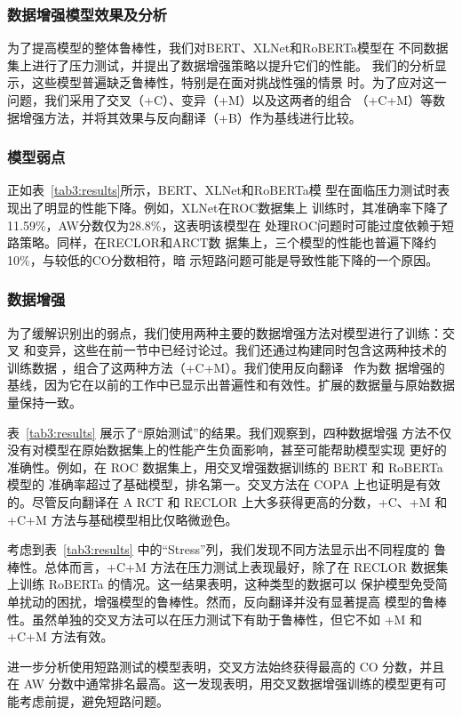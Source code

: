 \subsubsection{数据增强模型效果及分析}
\label{sec3:robust}
为了提高模型的整体鲁棒性，我们对BERT、XLNet和RoBERTa模型在
不同数据集上进行了压力测试，并提出了数据增强策略以提升它们的性能。
我们的分析显示，这些模型普遍缺乏鲁棒性，特别是在面对挑战性强的情景
时。为了应对这一问题，我们采用了交叉（+C）、变异（+M）以及这两者的组合
（+C+M）等数据增强方法，并将其效果与反向翻译（+B）作为基线进行比较。
    
\subsubsection*{模型弱点}
正如表~\ref{tab3:results}所示，BERT、XLNet和RoBERTa模
型在面临压力测试时表现出了明显的性能下降。例如，XLNet在ROC数据集上
训练时，其准确率下降了11.59\%，AW分数仅为28.8\%，这表明该模型在
处理ROC问题时可能过度依赖于短路策略。同样，在RECLOR和ARCT数
据集上，三个模型的性能也普遍下降约10\%，与较低的CO分数相符，暗
示短路问题可能是导致性能下降的一个原因。

\subsubsection*{数据增强}
为了缓解识别出的弱点，我们使用两种主要的数据增强方法对模型进行了训练：交叉
和变异，这些在前一节中已经讨论过。我们还通过构建同时包含这两种技术的训练数据
，组合了这两种方法（+C+M）。我们使用反向翻译~\cite{xie2020unsupervised} 作为数
据增强的基线，因为它在以前的工作中已显示出普遍性和有效性。扩展的数据量与原始数据量保持一致。

表~\ref{tab3:results} 展示了``原始测试''的结果。我们观察到，四种数据增强
方法不仅没有对模型在原始数据集上的性能产生负面影响，甚至可能帮助模型实现
更好的准确性。例如，在 ROC 数据集上，用交叉增强数据训练的 BERT 和 RoBERTa 模型的
准确率超过了基础模型，排名第一。交叉方法在 COPA 上也证明是有效的。尽管反向翻译在 A
RCT 和 RECLOR 上大多获得更高的分数，+C、+M 和 +C+M 方法与基础模型相比仅略微逊色。

考虑到表~\ref{tab3:results} 中的``Stress''列，我们发现不同方法显示出不同程度的
鲁棒性。总体而言，+C+M 方法在压力测试上表现最好，除了在 
RECLOR 数据集上训练 RoBERTa 的情况。这一结果表明，这种类型的数据可以
保护模型免受简单扰动的困扰，增强模型的鲁棒性。然而，反向翻译并没有显著提高
模型的鲁棒性。虽然单独的交叉方法可以在压力测试下有助于鲁棒性，但它不如 +M 和 +C+M 方法有效。

进一步分析使用短路测试的模型表明，交叉方法始终获得最高的 CO 分数，并且在 AW 
分数中通常排名最高。这一发现表明，用交叉数据增强训练的模型更有可能考虑前提，避免短路问题。

